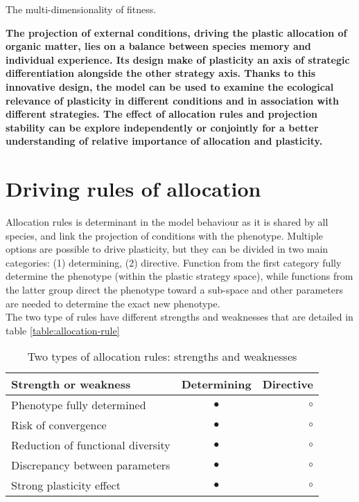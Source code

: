 The multi-dimensionality of fitness.

 
 
\textbf{The projection of external conditions, driving the plastic allocation of organic matter, lies on a balance between species memory and individual experience. Its design make of plasticity an axis of strategic differentiation alongside the other strategy axis. Thanks to this innovative design, the model can be used to examine the ecological relevance of plasticity in different conditions and in association with different strategies. The effect of allocation rules and projection stability can be explore independently or conjointly for a better understanding of relative importance of allocation and plasticity.}


\section{Driving rules of allocation}\label{section:allocation-rule}

Allocation rules is determinant in the model behaviour as it is shared by all species, and link the projection of conditions with the phenotype. Multiple options are possible to drive plasticity, but they can be divided in two main categories: (1) determining, (2) directive. Function from the first category fully determine the phenotype (within the plastic strategy space), while functions from the latter group direct the phenotype toward a sub-space and other parameters are needed to determine the exact new phenotype.\\
The two type of rules have different strengths and weaknesses that are detailed in table \ref{table:allocation-rule}

\begin{table}
\caption{Two types of allocation rules: strengths and weaknesses} 
\label{table:state_var_plant}
\begin{center}%
\begin{tabular}{l c r}
Strength or weakness & Determining & Directive \\ 
\hline 
Phenotype fully determined & \textcolor{myGreen}{$\bullet$} & $\circ$ \\
Risk of convergence & $\bullet$ &  $\circ$ \\
Reduction of functional diversity & $\bullet$ &  $\circ$\\
Discrepancy between parameters & $\bullet$ &  $\circ$\\
Strong plasticity effect & \textcolor{myGreen}{$\bullet$} & $\circ$
\end{tabular} 
\end{center}
\vspace*{0.5cm}
\end{table}

